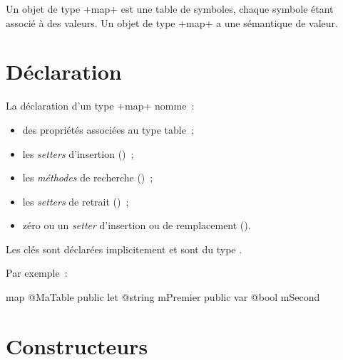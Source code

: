 



Un objet de type \ggs+map+ est une table de symboles, chaque symbole étant associé à des valeurs. Un objet de type \ggs+map+ a une sémantique de valeur.

\section{Déclaration}

La déclaration d'un type \ggs+map+ nomme~:
\begin{itemize}
  \item des propriétés associées au type table~;
  \item les \emph{setters} d'insertion ()~;
  \item les \emph{méthodes} de recherche ()~;
  \item les \emph{setters} de retrait ()~;
  \item zéro ou un \emph{setter} d'insertion ou de remplacement ().
\end{itemize}

Les clés sont déclarées implicitement et sont du type .

Par exemple~:

\begin{galgas}
map @MaTable {
  public let @string mPremier
  public var @bool mSecond
}
\end{galgas}







\section{Constructeurs}

